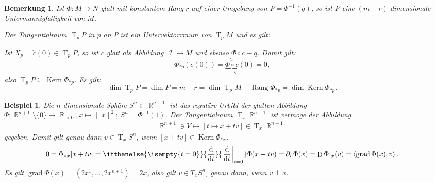 \documentclass[paper=A4, twoside, chapterprefix=true, bibliography=totoc, headsepline]{scrbook}
\newcommand{\tikzschnuller}[2][1]{
	\coordinate (schnuller1) at #2;
	\coordinate (schnuller2) at ($(schnuller1)+#1*(-1.75,-0.75)$);
	\coordinate (schnuller3) at ($(schnuller1)+#1*(-2.5,-2.25)$);
	\coordinate (schnuller4) at ($(schnuller1)+#1*(0,-2)$);
	\coordinate (schnuller5) at ($(schnuller1)+#1*(1.75,-0.25)$);
    
    \coordinate (ctrls1) at ($#1*(1.25,0.25)$);
    \coordinate (ctrls2) at ($-0.5*(ctrls1)$);
    \coordinate (ctrls4) at ($#1*(1,-1)$);
    \coordinate (ctrls3) at ($-0.5*(ctrls4)$);
    \coordinate (ctrls6) at ($#1*(1,1.5)$);
    \coordinate (ctrls5) at ($-0.33*(ctrls6)$);

    \coordinate (tang1) at ($(schnuller2)+(ctrls1)$);
    \coordinate (tang2) at ($(schnuller2)+(ctrls2)$);
    \coordinate (tang3) at ($(schnuller3)+(ctrls3)$);
    \coordinate (tang4) at ($(schnuller3)+(ctrls4)$);
    \coordinate (tang5) at ($(schnuller4)+(ctrls5)$);
    \coordinate (tang6) at ($(schnuller4)+(ctrls6)$);
	
	\draw (schnuller1) ..controls(schnuller1) and (tang1).. (schnuller2) ..controls(tang2) and (tang3).. (schnuller3) ..controls(tang4) and (tang5).. (schnuller4) ..controls(tang6) and (schnuller5).. (schnuller5);
	
	\def\angle{20} %
	\coordinate (c) at ($#2+#1*(-1.25,-1.25)$); %
	\begin{scope}
		\clip[rotate=\angle] ($(c)-#1*(1,0.6)$) rectangle ($(c)+#1*(1,-0.1)$);
		\path[draw,rotate=\angle,name path=l] (c) ellipse(#1*1 and #1*0.5);
	\end{scope}
	\path[name path=u,rotate=\angle] ($(c)-#1*(0,0.5)$) ellipse(#1*0.75 and #1*0.5);
	\path[name intersections={of=u and l}];
	\begin{scope}
		\clip[rotate=\angle] (intersection-1) rectangle ($(intersection-2)+#1*(0,0.5)$);
		\draw[rotate=\angle] ($(c)-#1*(0,0.5)$) ellipse(#1*0.75 and #1*0.5);
	\end{scope}		
}
\newcommand{\tikzsegel}[2][1]{
	\coordinate (segel1) at #2; \coordinate (segel2) at ($(segel1)+#1*(4,1.5)$); \coordinate (segel3) at ($(segel1)+#1*(2,-0.5)$);
	
	\coordinate (ctrls1) at ($#1*(0.75,1.5)$);
	\coordinate (ctrls2) at ($#1*(-0.75,0.25)$);
	\coordinate (ctrls3) at ($#1*(-0.5,-0.25)$);
	\coordinate (ctrls4) at ($#1*(0.25,1)$);
	\coordinate (ctrls5) at ($#1*(-0.375,0.375)$);
	\coordinate (ctrls6) at ($#1*(0.75,0.125)$);
	\coordinate (tang1) at ($(segel1)+(ctrls1)$);
	\coordinate (tang2) at ($(segel2)+(ctrls2)$);
	\coordinate (tang3) at ($(segel2)+(ctrls3)$);
	\coordinate (tang4) at ($(segel3)+(ctrls4)$);
	\coordinate (tang5) at ($(segel3)+(ctrls5)$);
	\coordinate (tang6) at ($(segel1)+(ctrls6)$);
	
	\draw (segel1) ..controls(tang1) and (tang2).. (segel2) ..controls(tang3) and (tang4).. (segel3) ..controls(tang5) and (tang6).. (segel1) --cycle;
}
\DeclareMathOperator{\R}{\mathbb{R}}
\DeclareMathOperator{\calI}{\mathcal{I}}
\DeclareMathOperator{\grad}{grad}   %
\DeclareMathOperator{\D}{D}         %
\DeclareMathOperator{\Kern}{Kern}
\DeclareMathOperator{\Rang}{Rang}   %
\DeclareMathOperator{\T}{T}         %
\newcommand{\dop}{\mathrm{d}}
\newcommand{\difffrac}[3][]{\ifthenelse{\isempty{#1}}{\frac{\dop #2}{\dop #3}}{\left. \frac{\dop #2}{\dop #3} \right|_{#1}}}
\theoremstyle{plain}
\newtheorem{Bsp}[Dfn]{Beispiel}
\theoremstyle{nonumberplain}
\newtheorem{bem}{Bemerkung}
\theoremstyle{empty}
\theoremstyle{break}
\begin{document}
\begin{bem}
  Ist $\Phi \colon M \to N$ glatt mit konstantem Rang $r$ auf einer Umgebung von $P = \Phi^{-1}(q)$, so ist $P$ eine $(m-r)$-dimensionale Untermannigfaltigkeit von $M$.
  
  Der Tangentialraum $\T_pP$ in $p$ an $P$ ist ein Untervektorrraum von $\T_pM$ und es gilt:
  \begin{center}\end{center}

  Ist $X_p = \dot c(0) \in \T_pP$, so ist $c$ glatt als Abbildung $\calI \to M$ und ebenso $\Phi \circ c \equiv q$.
  Damit gilt:
    \[ \Phi_{*p}(\dot c(0)) = \dot{\underbrace{\overline{\Phi \circ c}}_{\equiv q}}(0) = 0, \]
  also $\T_pP \subseteq \Kern \Phi_{*p}$. Es gilt:
   \[ \dim \T_pP = \dim P = m-r = \dim \T_pM - \Rang \Phi_{*p} = \dim \Kern \Phi_{*p}. \]
\end{bem}

\begin{Bsp}
  Die $n$-dimensionale Sph\"are $S^n \subset \R^{n+1}$ ist das regul\"are Urbild der glatten Abbildung $\Phi \colon \R^{n+1}\setminus \{0\} \to \R_{> 0}, x \mapsto \|x\|^2; \ S^n = \Phi^{-1}(1)$. Der Tangentialraum $\T_x\R^{n+1}$ ist verm\"oge der Abbildung
\begin{align*}
  \R^{n+1} \ni V \mapsto [t \mapsto x + tv] \in \T_x\R^{n+1}.
\end{align*}
gegeben. Damit gilt genau dann $v \in \T_xS^n$, wenn $[x+tv] \in \Kern \Phi_{*x}$.
\begin{align*}
  0 = \Phi_{*x}[x+tv] = \difffrac[t=0]{}{t} \Phi(x+tv) = \partial_v \Phi(x) = \D \Phi|_x(v) = \left<\grad\Phi(x),v\right>.
\end{align*}
Es gilt $\grad \Phi(x) = (2x^1, \ldots, 2x^{n+1}) = 2x$, also gilt $v \in T_xS^n$, genau dann, wenn $v \perp x$.
\end{Bsp}
\end{document}
